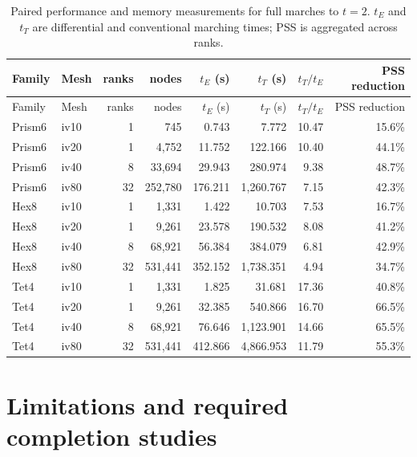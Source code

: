 \documentclass[11pt]{article}
\begin{document}
\begin{longtable}{llrrrrrr}
\caption{Paired performance and memory measurements for full marches to $t=2$.  $t_E$ and $t_T$ are differential and conventional marching times; PSS is aggregated across ranks.}\label{tab:performance}\\
\toprule
Family & Mesh & ranks & nodes & $t_E$ (s) & $t_T$ (s) & $t_T/t_E$ & PSS reduction \\
\midrule
\endfirsthead
\toprule
Family & Mesh & ranks & nodes & $t_E$ (s) & $t_T$ (s) & $t_T/t_E$ & PSS reduction \\
\midrule
\endhead
Prism6 & iv10 & 1 & 745 & 0.743 & 7.772 & 10.47 & 15.6\% \\
Prism6 & iv20 & 1 & 4,752 & 11.752 & 122.166 & 10.40 & 44.1\% \\
Prism6 & iv40 & 8 & 33,694 & 29.943 & 280.974 & 9.38 & 48.7\% \\
Prism6 & iv80 & 32 & 252,780 & 176.211 & 1,260.767 & 7.15 & 42.3\% \\
\addlinespace
Hex8 & iv10 & 1 & 1,331 & 1.422 & 10.703 & 7.53 & 16.7\% \\
Hex8 & iv20 & 1 & 9,261 & 23.578 & 190.532 & 8.08 & 41.2\% \\
Hex8 & iv40 & 8 & 68,921 & 56.384 & 384.079 & 6.81 & 42.9\% \\
Hex8 & iv80 & 32 & 531,441 & 352.152 & 1,738.351 & 4.94 & 34.7\% \\
\addlinespace
Tet4 & iv10 & 1 & 1,331 & 1.825 & 31.681 & 17.36 & 40.8\% \\
Tet4 & iv20 & 1 & 9,261 & 32.385 & 540.866 & 16.70 & 66.5\% \\
Tet4 & iv40 & 8 & 68,921 & 76.646 & 1,123.901 & 14.66 & 65.5\% \\
Tet4 & iv80 & 32 & 531,441 & 412.866 & 4,866.953 & 11.79 & 55.3\% \\
\bottomrule
\end{longtable}

\section{Limitations and required completion studies}\label{sec:limitations}
\end{document}
